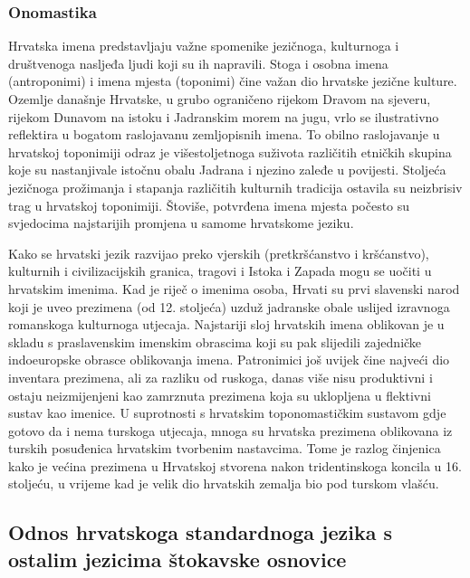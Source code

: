 \begin{multicols}{2}
\subsubsection{Onomastika}

Hrvatska imena predstavljaju važne spomenike jezičnoga, kulturnoga i društvenoga nasljeđa ljudi koji su ih napravili. Stoga i osobna imena (antroponimi) i imena mjesta (toponimi) čine važan dio hrvatske jezične kulture. Ozemlje današnje Hrvatske, u grubo ograničeno rijekom Dravom na sjeveru, rijekom Dunavom na istoku i Jadranskim morem na jugu, vrlo se ilustrativno reflektira u bogatom raslojavanu zemljopisnih imena. To obilno raslojavanje u hrvatskoj toponimiji odraz je višestoljetnoga suživota različitih etničkih skupina koje su nastanjivale istočnu obalu Jadrana i njezino zaleđe u povijesti. Stoljeća jezičnoga prožimanja i stapanja različitih kulturnih tradicija ostavila su neizbrisiv trag u hrvatskoj toponimiji. Štoviše, potvrđena imena mjesta počesto su svjedocima najstarijih promjena u samome hrvatskome jeziku.


Kako se hrvatski jezik razvijao preko vjerskih (pretkršćanstvo i kršćanstvo), kulturnih i civilizacijskih granica, tragovi i Istoka i Zapada mogu se uočiti u hrvatskim imenima. Kad je riječ o imenima osoba, Hrvati su prvi slavenski narod koji je uveo prezimena (od 12. stoljeća) uzduž jadranske obale uslijed izravnoga romanskoga kulturnoga utjecaja. Najstariji sloj hrvatskih imena oblikovan je u skladu s praslavenskim imenskim obrascima koji su pak slijedili zajedničke indoeuropske obrasce oblikovanja imena. Patronimici još uvijek čine najveći dio inventara prezimena, ali za razliku od ruskoga, danas više nisu produktivni i ostaju neizmijenjeni kao zamrznuta prezimena koja su uklopljena u flektivni sustav kao imenice. U suprotnosti s hrvatskim toponomastičkim sustavom gdje gotovo da i nema turskoga utjecaja, mnoga su hrvatska prezimena oblikovana iz turskih posuđenica hrvatskim tvorbenim nastavcima. Tome je razlog činjenica kako je većina prezimena u Hrvatskoj stvorena nakon tridentinskoga koncila u 16. stoljeću, u vrijeme kad je velik dio hrvatskih zemalja bio pod turskom vlašću.

\subsection{Odnos hrvatskoga standardnoga jezika s ostalim jezicima štokavske osnovice}


\end{multicols}
